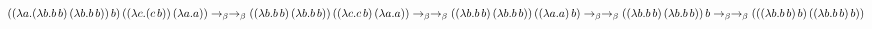 \documentclass[fleqn]{article}
\begin{document}
\Large
$((\lambda a.(\lambda b.b\,b)\,(\lambda b.b\,b))\,b)\,((\lambda c.(c\,b))\,(\lambda a.a)) \to_\beta
\\* \to_\beta ((\lambda b.b\,b)\,(\lambda b.b\,b))\,((\lambda c.c\,b)\,(\lambda a.a)) \to_\beta
\\* \to_\beta ((\lambda b.b\,b)\,(\lambda b.b\,b))\,((\lambda a.a)\,b) \to_\beta 
\\* \to_\beta ((\lambda b.b\,b)\,(\lambda b.b\,b))\,b \to_\beta
\\* \to_\beta (((\lambda b.b\,b)\,b)\,((\lambda b.b\,b)\,b))$
\end{document}

